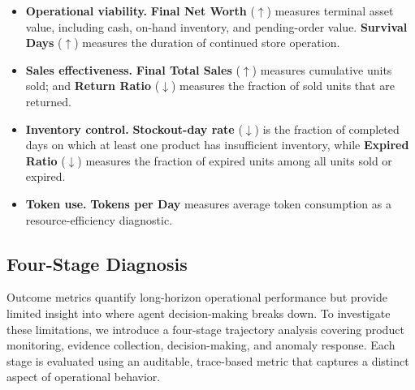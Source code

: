 \begin{itemize}[leftmargin=*]

    \item \textbf{Operational viability.}
    \textbf{Final Net Worth} ($\uparrow$) measures terminal asset value, including cash, on-hand inventory, and pending-order value. \textbf{Survival Days} ($\uparrow$) measures the duration of continued store operation.

    \item \textbf{Sales effectiveness.}
    \textbf{Final Total Sales} ($\uparrow$) measures cumulative units sold; and \textbf{Return Ratio} ($\downarrow$) measures the fraction of sold units that are returned.

    \item \textbf{Inventory control.}
    \textbf{Stockout-day rate} ($\downarrow$) is the fraction of completed days on which at least one product has insufficient inventory, while \textbf{Expired Ratio} ($\downarrow$) measures the fraction of expired units among all units sold or expired.

    \item \textbf{Token use.}
    \textbf{Tokens per Day} measures average token consumption as a resource-efficiency diagnostic.

\end{itemize}


\subsection{Four-Stage Diagnosis}
\label{sec:four_stage_setup}

Outcome metrics quantify long-horizon operational performance but provide limited insight into where agent decision-making breaks down. To investigate these limitations, we introduce a four-stage trajectory analysis covering product monitoring, evidence collection, decision-making, and anomaly response. Each stage is evaluated using an auditable, trace-based metric that captures a distinct aspect of operational behavior.


